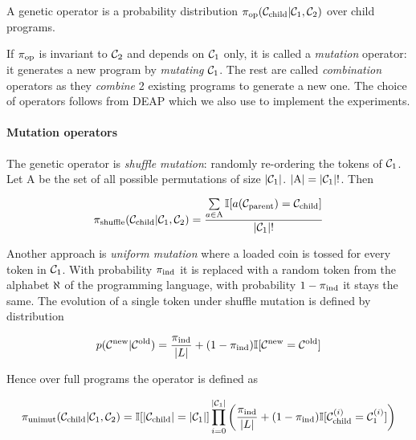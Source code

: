 A genetic operator is a probability distribution $\pi_\text{op}(\mathcal{C}_\text{child}|\mathcal{C}_1,\mathcal{C}_2)$ over child programs. 

If $\pi_\text{op}$ is invariant to $\mathcal{C}_2$ and depends on $\mathcal{C}_1$ only, it is called a \emph{mutation} operator: it generates a new program by \emph{mutating} $\mathcal{C}_1$.
The rest are called \emph{combination} operators as they \emph{combine} 2 existing programs to generate a new one.
The choice of operators follows from DEAP \cite{fortinDEAPEvolutionaryAlgorithms2012,derainvilleDEAPEnablingNimbler2014,derainvilleDEAPPythonFramework2012} which we also use to implement the experiments.

\paragraph{Mutation operators}

The genetic operator is \emph{shuffle mutation}: randomly re-ordering the tokens of $\mathcal{C}_1$.
Let $\mathrm{A}$ be the set of all possible permutations of size $|\mathcal{C}_1|$. $|\mathrm{A}|=|\mathcal{C}_1|!$. 
Then

\begin{equation}
    \pi_\text{shuffle}(\mathcal{C}_\text{child}|\mathcal{C}_1,\mathcal{C}_2) =
            \frac{\sum\limits_{a \in \mathrm{A}} \mathbb{I} [a(\mathcal{C}_\text{parent}) = \mathcal{C}_\text{child}]}{|\mathcal{C}_1|!}
\end{equation}

Another approach is \emph{uniform mutation} where a loaded coin is tossed for every token in $\mathcal{C}_1$. 
With probability $\pi_\text{ind}$ it is replaced with a random token from the alphabet $\aleph$ of the programming language, with probability $1-\pi_\text{ind}$ it stays the same.
The evolution of a single token under shuffle mutation is defined by distribution

\begin{equation}
    p(\mathcal{C}^\text{new} | \mathcal{C}^\text{old}) = \frac{\pi_\text{ind}}{|L|} +  (1 - \pi_\text{ind}) \mathbb{I} [\mathcal{C}^\text{new} = \mathcal{C}^\text{old}]
\end{equation}

Hence over full programs the operator is defined as

\begin{equation}
    \pi_\text{unimut}(\mathcal{C}_\text{child}|\mathcal{C}_1,\mathcal{C}_2) = \mathbb{I} [|\mathcal{C}_\text{child}|=|\mathcal{C}_1|] \\ 
    \prod\limits_{i=0}^{|\mathcal{C}_1|}  \left(\frac{\pi_\text{ind}}{|L|} +  (1 - \pi_\text{ind}) \mathbb{I} [\mathcal{C}_\text{child}^{(i)} = \mathcal{C}_1^{(i)}] \right)
\end{equation}


